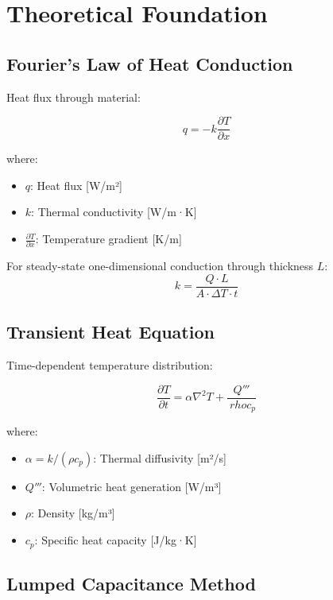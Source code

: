 \documentclass[12pt,a4paper]{article}
\begin{document}
\section{Theoretical Foundation}

\subsection{Fourier's Law of Heat Conduction}

Heat flux through material:

\begin{equation}
q = -k\frac{\partial T}{\partial x}
\end{equation}

where:
\begin{itemize}
\item $q$: Heat flux [W/m²]
\item $k$: Thermal conductivity [W/m·K]
\item $\frac{\partial T}{\partial x}$: Temperature gradient [K/m]
\end{itemize}

For steady-state one-dimensional conduction through thickness $L$:
\begin{equation}
k = \frac{Q \cdot L}{A \cdot \Delta T \cdot t}
\end{equation}

\subsection{Transient Heat Equation}

Time-dependent temperature distribution:

\begin{equation}
\frac{\partial T}{\partial t} = \alpha \nabla^2 T + \frac{Q'''}{\ rho c_p}
\end{equation}

where:
\begin{itemize}
\item $\alpha = k/(\rho c_p)$: Thermal diffusivity [m²/s]
\item $Q'''$: Volumetric heat generation [W/m³]
\item $\rho$: Density [kg/m³]
\item $c_p$: Specific heat capacity [J/kg·K]
\end{itemize}

\subsection{Lumped Capacitance Method}
\end{document}
